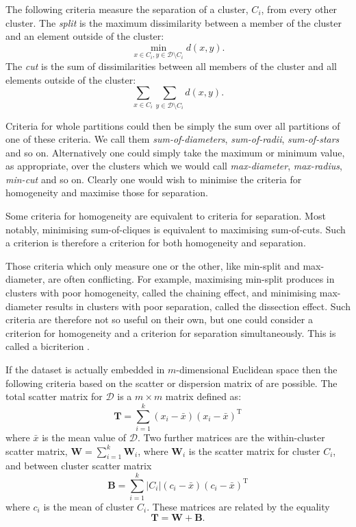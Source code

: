 \documentclass[a4paper]{report}
\newcommand{\dset}{\mathcal{D}}
\begin{document}
The following criteria measure the separation of a cluster, $C_i$, from every
other cluster.  The \textit{split} is the maximum dissimilarity between a
member of the cluster and an element outside of the cluster:
\begin{equation*}
  \min_{x \in C_i, y \in \dset \setminus C_i} d(x,y).
\end{equation*}
The \textit{cut} is the sum of dissimilarities between all members of the
cluster and all elements outside of the cluster:
\begin{equation*}
  \sum_{x \in C_i} \sum_{y \in \dset \setminus C_i} d(x,y).
\end{equation*}

Criteria for whole partitions could then be simply the sum over all partitions
of one of these criteria.  We call them \textit{sum-of-diameters},
\textit{sum-of-radii}, \textit{sum-of-stars} and so on.  Alternatively one
could simply take the maximum or minimum value, as appropriate, over the
clusters which we would call \textit{max-diameter}, \textit{max-radius},
\textit{min-cut} and so on.  Clearly one would wish to minimise the criteria
for homogeneity and maximise those for separation.

Some criteria for homogeneity are equivalent to criteria for separation.  Most
notably, minimising sum-of-cliques is equivalent to maximising sum-of-cuts.
Such a criterion is therefore a criterion for both homogeneity and separation.

Those criteria which only measure one or the other, like min-split and
max-diameter, are often conflicting.  For example, maximising min-split
produces in clusters with poor homogeneity, called the chaining effect, and
minimising max-diameter results in clusters with poor separation, called the
dissection effect.  Such criteria are therefore not so useful on their own,
but one could consider a criterion for homogeneity and a criterion for
separation simultaneously.  This is called a bicriterion
\citep{delattre1980bicriterion}.

If the dataset is actually embedded in $m$-dimensional Euclidean space then
the following criteria based on the scatter or dispersion matrix of
\citet{wilks60} are possible.  The total scatter matrix for $\dset$ is a $m
\times m$ matrix defined
as:
\begin{equation*}
  \mathbf{T} = \sum_{i=1}^{k} (x_i - \bar{x})(x_i - \bar{x})^{\mathrm{T}}
\end{equation*}
where $\bar{x}$ is the mean value of $\dset$.  Two further matrices are
the within-cluster scatter matrix, $\mathbf{W} = \sum_{i=1}^{k} \mathbf{W}_i$,
where $\mathbf{W}_i$ is the scatter matrix for cluster $C_i$, and between
cluster scatter matrix
\begin{equation*}
  \mathbf{B} =
  \sum_{i=1}^{k} |C_i| (c_i - \bar{x}) (c_i - \bar{x})^{\mathrm{T}}
\end{equation*}
where $c_i$ is the mean of cluster $C_i$.  These matrices are related by the
equality
\begin{equation*}
  \mathbf{T} = \mathbf{W} + \mathbf{B}.
\end{equation*}
\end{document}
